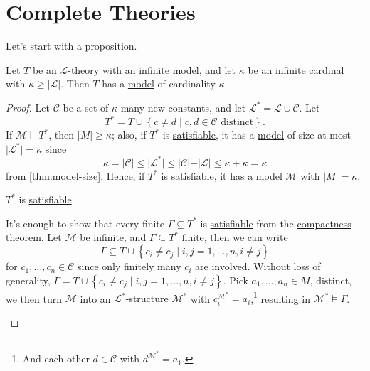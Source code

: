 \section{Complete Theories}
Let's start with a proposition.

\begin{proposition}\label{prop:lec10}
	Let \(T\) be an \hyperref[def:theory]{\(\mathcal{L}\)-theory} with an infinite \hyperref[def:model]{model}, and let \(\kappa \) be an infinite cardinal with \(\kappa \geq \vert \mathcal{L}  \vert \). Then \(T\) has a \hyperref[def:model]{model} of cardinality \(\kappa \).
\end{proposition}
\begin{proof}
	Let \(\mathcal{C} \) be a set of \(\kappa \)-many new constants, and let \(\mathcal{L} ^{\ast} = \mathcal{L} \cup \mathcal{C} \). Let
	\[
		T^{\ast} = T \cup \left\{ c \neq d \mid c, d\in \mathcal{C} \text{ distinct}  \right\} .
	\]
	If \(\mathcal{M} \models T^{\ast} \), then \(\vert M \vert \geq \kappa \); also, if \(T^{\ast} \) is \hyperref[def:satisfiable]{satisfiable}, it has a \hyperref[def:model]{model} of size at most \(\vert \mathcal{L} ^{\ast} \vert = \kappa \) since
	\[
		\kappa = \vert \mathcal{C} \vert \leq \vert \mathcal{L} ^{\ast} \vert \leq \vert \mathcal{C} \vert + \vert \mathcal{L} \vert \leq \kappa + \kappa = \kappa
	\]
	from \autoref{thm:model-size}. Hence, if \(T^{\ast} \) is \hyperref[def:satisfiable]{satisfiable}, it has a \hyperref[def:model]{model} \(\mathcal{M} \) with \(\vert M \vert = \kappa \).

	\begin{claim}
		\(T^{\ast} \) is \hyperref[def:satisfiable]{satisfiable}.
	\end{claim}
	\begin{explanation}
		It's enough to show that every finite \(\Gamma \subseteq T^{\ast} \) is \hyperref[def:satisfiable]{satisfiable} from the \hyperref[thm:compactness]{compactness theorem}. Let \(\mathcal{M} \) be infinite, and \(\Gamma \subseteq T^{\ast} \) finite, then we can write
		\[
			\Gamma \subseteq T \cup \left\{ c_i \neq c_j \mid i, j = 1, \dots , n, i \neq j \right\}
		\]
		for \(c_1, \dots , c_n\in \mathcal{C} \) since only finitely many \(c_i\) are involved. Without loss of generality, \(\Gamma = T \cup \left\{ c_i \neq c_j \mid i, j=1, \dots , n, i \neq j \right\} \). Pick \(a_1, \dots , a_n\in M\), distinct, we then turn \(\mathcal{M} \) into an \hyperref[def:structure]{\(\mathcal{L} ^{\ast} \)-structure} \(\mathcal{M} ^{\ast} \) with \(c_i ^{\mathcal{M} ^{\ast} } = a_i\),\footnote{And each other \(d\in \mathcal{C} \) with \(d^{\mathcal{M} ^{\ast} } = a_1\).} resulting in \(\mathcal{M} ^{\ast} \models \Gamma \).
	\end{explanation}
\end{proof}